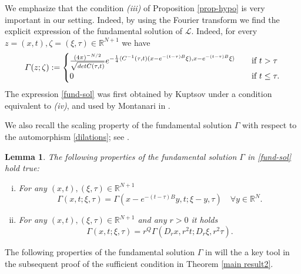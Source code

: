 \documentclass{amsart}
\newtheorem{lemma}[thm]{Lemma}
\numberwithin{equation}{section}
\def \Lc{{\mathcal{L}}}
\def \r{{\mathbb{R}}}
\renewcommand{\Gamma}{\varGamma}
\begin{document}
{We emphasize that the condition {\it (iii)} of Proposition \ref{prop-hypo} is very important in our setting. Indeed, by using the Fourier transform we find the explicit expression of the fundamental solution of $\Lc$. Indeed, for every $z = (x,t), \zeta = (\xi,\tau) \in \r^{N+1}$ 
we have
\begin{equation} \label{fund-sol}
	\Gamma(z;\zeta):= 
    \begin{cases}
        \frac{(4\pi)^{-N/2}}{\sqrt{\textup{det}C(\tau,t)}}
	e^{-\frac{1}{4}\langle C^{-1}(\tau,t)( x- e^{-(t-\tau)B}\xi ) , x- e^{-(t-\tau)B}\xi \rangle} & \quad \text{if} \ t > \tau\\
    0 & \quad \text{if}\ t \le \tau.
        \end{cases}
\end{equation}
The expression \eqref{fund-sol} was first obtained by Kuptsov under a condition equivalent to {\it (iv)}, and used by Montanari in \cite{Mon96}. { We also recall the scaling property of the fundamental solution $\Gamma$ with respect to the automorphism \eqref{dilations}; see \cite[Lemma 2.1]{Mon96}.

\begin{lemma}\label{lemma:dilation-fundamental}
The following properties of the fundamental solution $\Gamma$ in \eqref{fund-sol} hold true:
\begin{enumerate}[(i)]
 \item   For any $(x,t),(\xi,\tau) \in \mathbb{R}^{N+1}$ 
         \[
         \Gamma(x,t;\xi,\tau) = \Gamma(x-e^{-(t-\tau)B}y,t;\xi-y,\tau) \quad \forall y \in \r^N.
         \]
 \item   For any $(x,t),(\xi,\tau) \in \mathbb{R}^{N+1}$ and any $r>0$ it holds
    \[
   \Gamma(x,t;\xi,\tau) =  r^{Q}\Gamma(D_r x, r^2 t; D_r \xi, r^2 \tau).
    \]
\end{enumerate}
\end{lemma}
The following properties of the fundamental solution $\Gamma$ in will the a key tool in the subsequent proof of the sufficient condition in Theorem \ref{main result2}.

}}
\end{document}
